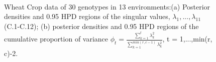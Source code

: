 \begin{figure}
	\centering	
	 \\
	\caption[Posterior densities and regions for singular values and cumulative proportion]{Wheat Crop data of 30 genotypes in 13 environments:(a) Posterior densities and 0.95 HPD regions of the singular values, $\lambda_1,...,\lambda_{11}$ (C.1-C.12); (b) posterior densities and 0.95 HPD regions of the cumulative proportion of variance $\phi_t=\frac{\sum_{k=1}^t\lambda_k^2}{\sum_{k=1}^{min(r,c-1)}\lambda_k^2}$, t = 1,...,min(r, c)-2. }
\label{Figure:4.12}
\end{figure}


